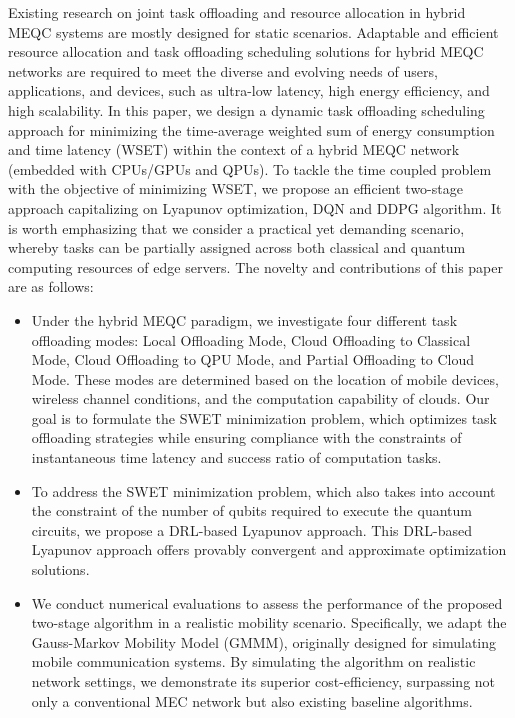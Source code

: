 \documentclass[journal]{IEEEtran}
\begin{document}
Existing research on joint task offloading and resource allocation in hybrid MEQC systems are mostly designed for static scenarios.
Adaptable and efficient resource allocation and task offloading scheduling solutions for hybrid MEQC networks are required to meet the diverse and evolving needs of users, applications, and devices, such as ultra-low latency, high energy efficiency, and high scalability.
In this paper, we design a dynamic task offloading scheduling approach for minimizing the time-average weighted sum of energy consumption and time latency (WSET) within the context of a hybrid MEQC network (embedded with CPUs/GPUs and QPUs).
To tackle the time coupled problem with the objective of minimizing WSET, we propose an efficient two-stage approach capitalizing on Lyapunov optimization, DQN and DDPG algorithm.
It is worth emphasizing that we consider a practical yet demanding scenario, whereby tasks can be partially assigned across both classical and quantum computing resources of edge servers.
The novelty and contributions of this paper are as follows:
\begin{itemize}
    \item Under the hybrid MEQC paradigm, we investigate four different task offloading modes: Local Offloading Mode, Cloud Offloading to Classical Mode, Cloud Offloading to QPU Mode, and Partial Offloading to Cloud Mode. These modes are determined based on the location of mobile devices, wireless channel conditions, and the computation capability of clouds. Our goal is to formulate the SWET minimization problem, which optimizes task offloading strategies while ensuring compliance with the constraints of instantaneous time latency and success ratio of computation tasks.
    \item To address the SWET minimization problem, which also takes into account the constraint of the number of qubits required to execute the quantum circuits, we propose a DRL-based Lyapunov approach.
    This DRL-based Lyapunov approach offers provably convergent and approximate optimization solutions.
    \item We conduct numerical evaluations to assess the performance of the proposed two-stage algorithm in a realistic mobility scenario. Specifically, we adapt the Gauss-Markov Mobility Model (GMMM), originally designed for simulating mobile communication systems. By simulating the algorithm on realistic network settings, we demonstrate its superior cost-efficiency, surpassing not only a conventional MEC network but also existing baseline algorithms.
\end{itemize}
\end{document}
